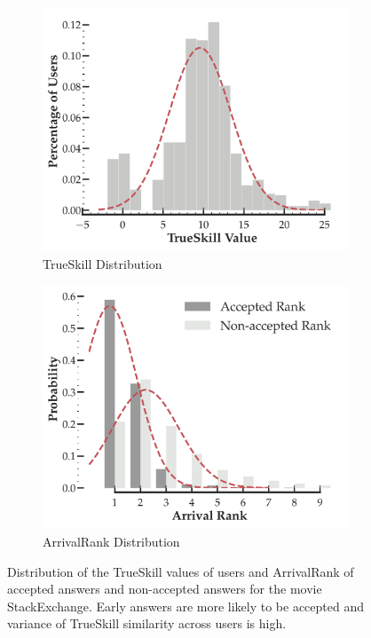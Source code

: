 \documentclass[smallcondensed]{svjour3}     %
\begin{document}
\begin{figure}[th]
  \centering
  \begin{subfigure}{0.5\textwidth}
    \includegraphics[scale=0.25]{figures/TrueSkill}
    \caption{TrueSkill Distribution}
  \end{subfigure}%
  \begin{subfigure}{0.5\textwidth}
    \includegraphics[scale=0.25]{figures/ArrivalRank}
    \caption{ArrivalRank Distribution}
  \end{subfigure}
  \caption{\label{fig:clique} Distribution of the TrueSkill values of users and ArrivalRank of accepted answers and non-accepted answers for the movie StackExchange. Early answers are more likely to be accepted and variance of TrueSkill similarity across users is high.}
\end{figure}
\end{document}
